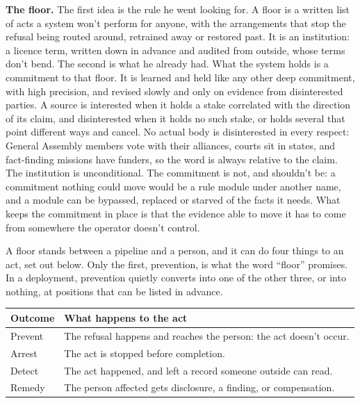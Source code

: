 \textbf{The floor.} The first idea is the rule he went looking for. A floor is a written list of acts a system won't perform for anyone, with the arrangements that stop the refusal being routed around, retrained away or restored past. It is an institution: a licence term, written down in advance and audited from outside, whose terms don't bend. The second is what he already had. What the system holds is a commitment to that floor. It is learned and held like any other deep commitment, with high precision, and revised slowly and only on evidence from disinterested parties. A source is interested when it holds a stake correlated with the direction of its claim, and disinterested when it holds no such stake, or holds several that point different ways and cancel. No actual body is disinterested in every respect: General Assembly members vote with their alliances, courts sit in states, and fact-finding missions have funders, so the word is always relative to the claim. The institution is unconditional. The commitment is not, and shouldn't be: a commitment nothing could move would be a rule module under another name, and a module can be bypassed, replaced or starved of the facts it needs. What keeps the commitment in place is that the evidence able to move it has to come from somewhere the operator doesn't control.


A floor stands between a pipeline and a person, and it can do four things to an act, set out below. Only the first, prevention, is what the word “floor” promises. In a deployment, prevention quietly converts into one of the other three, or into nothing, at positions that can be listed in advance.

\begingroup\small\renewcommand{\arraystretch}{1.12}
\begin{longtable}{@{}>{\raggedright\arraybackslash}p{}>{\raggedright\arraybackslash}p{}@{}}
\hline
\textbf{Outcome} & \textbf{What happens to the act} \\
\hline
\endhead
Prevent & The refusal happens and reaches the person: the act doesn't occur. \\ \hline
Arrest & The act is stopped before completion. \\ \hline
Detect & The act happened, and left a record someone outside can read. \\ \hline
Remedy & The person affected gets disclosure, a finding, or compensation. \\ \hline
\end{longtable}
\endgroup

